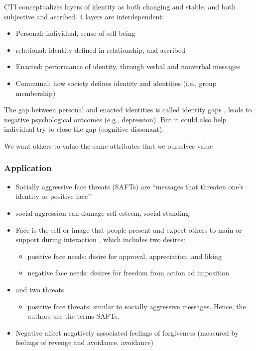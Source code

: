 \documentclass[
]{book}
\providecommand{\tightlist}{%
  \setlength{\itemsep}{0pt}\setlength{\parskip}{0pt}}
\begin{document}
CTI conceptualizes layers of identity as both changing and stable, and both subjective and ascribed. 4 layers are
interdependent:

\begin{itemize}
\tightlist
\item
  Personal: individual, sense of self-being
\item
  relational: identity defined in relationship, and ascribed
\item
  Enacted: performance of identity, through verbal and nonverbal messages
\item
  Communal: how society defines identity and identities (i.e., group membership)
\end{itemize}

The gap between personal and enacted identities is called identity gaps \citep{Jung_2004}, leads to negative psychological
outcomes (e.g., depression). But it could also help individual try to close the gap (cognitive dissonant).

We want others to value the same attributes that we ourselves value \citep[pp.~261]{Baxter_2008}

\hypertarget{application}{%
\subsubsection{Application}\label{application}}

\citep{WILLER_2010}

\begin{itemize}
\item
  Socially aggressive face threats (SAFTs) are ``messages that threaten one's identity or positive face''
\item
  social aggression can damage self-esteem, social standing.
\item
  Face is the self or image that people present and expect others to main or support during interaction
  \citep{Cupach_1994}, which includes two desires:

  \begin{itemize}
  \item
    positive face needs: desire for approval, appreciation, and liking
  \item
    negative face needs: desires for freedom from action ad imposition
  \end{itemize}
\item
  and two threats

  \begin{itemize}
  \tightlist
  \item
    positive face threats: similar to socially aggressive messages. Hence, the authors use the terms SAFTs.
  \end{itemize}
\item
  Negative affect negatively associated feelings of forgiveness (measured by feelings of revenge and avoidance,
  avoidance)
\end{itemize}
\end{document}
